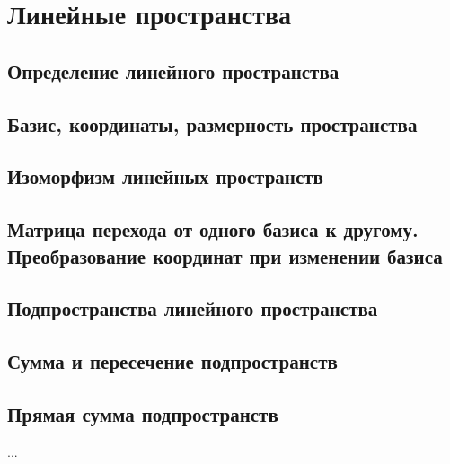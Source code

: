 \section{Линейные пространства}
\subsection{Определение линейного пространства}

\subsection{Базис, координаты, размерность пространства}
\subsection{Изоморфизм линейных пространств}
\subsection{Матрица перехода от одного базиса к другому. Преобразование координат при изменении базиса}
\subsection{Подпространства линейного пространства}
\subsection{Сумма и пересечение подпространств}
\subsection{Прямая сумма подпространств}
...
